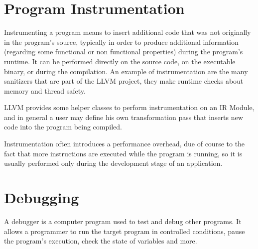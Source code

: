 \section{Program Instrumentation}
Instrumenting a program means to insert additional code that was not originally in the program's source, typically in order to produce additional information (regarding some functional or non functional properties) during the program's runtime. It can be performed directly on the source code, on the executable binary, or during the compilation.
An example of instrumentation are the many sanitizers that are part of the LLVM project, they make runtime checks about memory and thread safety. \par 
LLVM provides some helper classes to perform instrumentation on an IR Module, and in general a user may define his own transformation pass that inserts new code into the program being compiled.
\par
Instrumentation often introduces a performance overhead, due of course to the fact that more instructions are executed while the program is running, so it is usually performed only during the development stage of an application.


\section{Debugging}
A debugger is a computer program used to test and debug other programs. It allows a programmer to run the target program in controlled conditions, pause the program's execution, check the state of variables and more.

